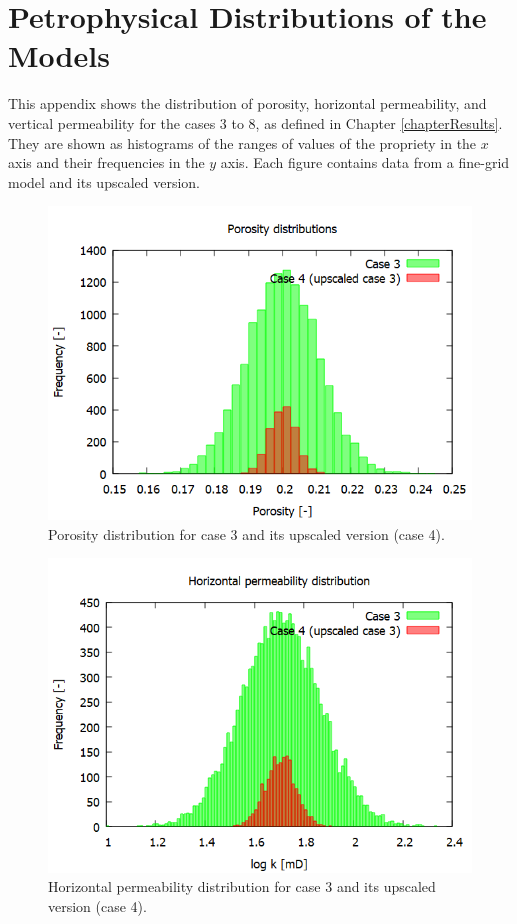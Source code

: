 \chapter{Petrophysical Distributions of the Models}
\label{appendixModelsDescriptions}

This appendix shows the distribution of porosity, horizontal permeability, and vertical permeability for the cases 3 to 8, as defined in Chapter \ref{chapterResults}. They are shown as histograms of the ranges of values of the propriety in the $x$ axis and their frequencies in the $y$ axis. Each figure contains data from a fine-grid model and its upscaled version.
\begin{figure}[H]
	\centering
	\includegraphics[width=0.82\linewidth]{Images/37}
	\caption{Porosity distribution for case 3 and its upscaled version (case 4).}
	\label{fig:37}
\end{figure}
\begin{figure}[H]
	\centering
	\includegraphics[width=0.82\linewidth]{Images/38}
	\caption{Horizontal permeability distribution for case 3 and its upscaled version (case 4).}
	\label{fig:38}
\end{figure}
